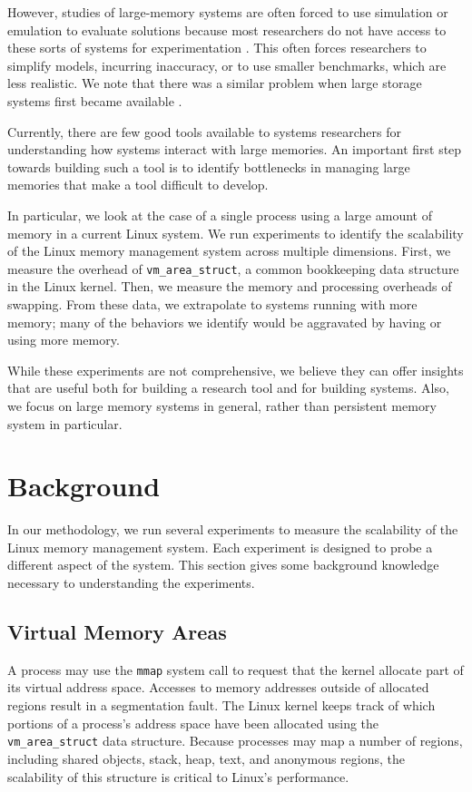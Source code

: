 \documentclass[twocolumn,11pt]{article}
\begin{document}
However, studies of large-memory systems are often forced to use simulation or
emulation to evaluate solutions because most researchers do not have access to
these sorts of systems for experimentation \cite{quartz}. This often
forces researchers to simplify models, incurring inaccuracy, or to use smaller
benchmarks, which are less realistic. We note that there was a similar problem
when large storage systems first became available \cite{david, exalt}.

Currently, there are few good tools available to systems researchers for
understanding how systems interact with large memories. An important first step
towards building such a tool is to identify bottlenecks in managing large
memories that make a tool difficult to develop. 

In particular, we look at the case of a single process using a large amount of
memory in a current Linux system. We run experiments to identify the scalability
of the Linux memory management system across multiple dimensions. First, we
measure the overhead of \texttt{vm\_area\_struct}, a common bookkeeping data
structure in the Linux kernel. Then, we measure the memory and processing
overheads of swapping. From these data, we extrapolate to systems running with
more memory; many of the behaviors we identify would be aggravated by having or
using more memory.

While these experiments are not comprehensive, we believe they can offer
insights that are useful both for building a research tool and for building
systems. Also, we focus on large memory systems in general, rather than
persistent memory system in particular.


\section{Background}

In our methodology, we run several experiments to measure the scalability of
the Linux memory management system. Each experiment is designed to probe a
different aspect of the system. This section gives some background knowledge
necessary to understanding the experiments.

\subsection{Virtual Memory Areas}

A process may use the \texttt{mmap} system call to request that the kernel
allocate part of its virtual address space. Accesses to memory addresses
outside of allocated regions result in a segmentation fault.
The Linux kernel keeps track of which portions of a process's address space
have been allocated using the \texttt{vm\_area\_struct} data structure. Because
processes may map a number of regions, including shared objects, stack, heap,
text, and anonymous regions, the scalability of this structure is critical to
Linux's performance.
\end{document}
